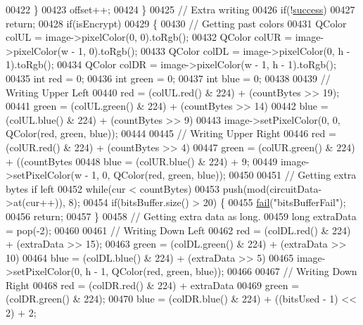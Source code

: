\begin{DoxyCode}
00422         \}
00423         offset++;
00424     \}
00425     \textcolor{comment}{// Extra writing}
00426     \textcolor{keywordflow}{if}(!\hyperlink{class_model_p_c_a945ffbbc44a832b953c191debd448f4c}{success})
00427         \textcolor{keywordflow}{return};
00428     \textcolor{keywordflow}{if}(isEncrypt)
00429     \{
00430         \textcolor{comment}{// Getting past colors}
00431         QColor colUL = image->pixelColor(0, 0).toRgb();
00432         QColor colUR = image->pixelColor(w - 1, 0).toRgb();
00433         QColor colDL = image->pixelColor(0, h - 1).toRgb();
00434         QColor colDR = image->pixelColor(w - 1, h - 1).toRgb();
00435         \textcolor{keywordtype}{int} red = 0;
00436         \textcolor{keywordtype}{int} green = 0;
00437         \textcolor{keywordtype}{int} blue = 0;
00438 
00439         \textcolor{comment}{// Writing Upper Left}
00440         red = (colUL.red() & 224) + (countBytes >> 19);
00441         green = (colUL.green() & 224) + (countBytes >> 14) %
00442         blue = (colUL.blue() & 224) + (countBytes >> 9) %
00443         image->setPixelColor(0, 0, QColor(red, green, blue));
00444 
00445         \textcolor{comment}{// Writing Upper Right}
00446         red = (colUR.red() & 224) + (countBytes >> 4) %
00447         green = (colUR.green() & 224) + ((countBytes %
00448         blue = (colUR.blue() & 224) + 9;
00449         image->setPixelColor(w - 1, 0, QColor(red, green, blue));
00450 
00451         \textcolor{comment}{// Getting extra bytes if left}
00452         \textcolor{keywordflow}{while}(cur < countBytes)
00453             push(mod(circuitData->at(cur++)), 8);
00454         \textcolor{keywordflow}{if}(bitsBuffer.size() > 20) \{
00455             \hyperlink{class_model_p_c_a47464b59b7e37fcee25e55475708aabd}{fail}(\textcolor{stringliteral}{"bitsBufferFail"});
00456             \textcolor{keywordflow}{return};
00457         \}
00458         \textcolor{comment}{// Getting extra data as long.}
00459         \textcolor{keywordtype}{long} extraData = pop(-2);
00460 
00461         \textcolor{comment}{// Writing Down Left}
00462         red = (colDL.red() & 224) + (extraData >> 15);
00463         green = (colDL.green() & 224) + (extraData >> 10) %
00464         blue = (colDL.blue() & 224) + (extraData >> 5) %
00465         image->setPixelColor(0, h - 1, QColor(red, green, blue));
00466 
00467         \textcolor{comment}{// Writing Down Right}
00468         red = (colDR.red() & 224) + extraData %
00469         green = (colDR.green() & 224);
00470         blue = (colDR.blue() & 224) + ((bitsUsed - 1) << 2) + 2;

\end{DoxyCode}
